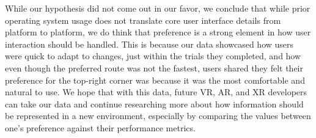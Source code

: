 \documentclass[acmlarge]{acmart}
\begin{document}
While our hypothesis did not come out in our favor, we conclude that while prior operating system usage does not translate core user interface details from platform to platform, we do think that preference is a strong element in how user interaction should be handled. This is because our data showcased how users were quick to adapt to changes, just within the trials they completed, and how even though the preferred route was not the fastest, users shared they felt their preference for the top-right corner was because it was the most comfortable and natural to use. We hope that with this data, future VR, AR, and XR developers can take our data and continue researching more about how information should be represented in a new environment, especially by comparing the values between one’s preference against their performance metrics. 







\end{document}
